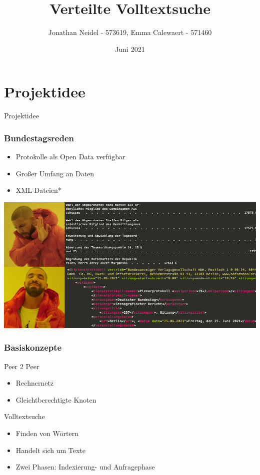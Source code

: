 \documentclass{beamer}
\title{Verteilte Volltextsuche}
\subtitle{}
\author{Jonathan Neidel - 573619, Emma Calewaert - 571460} %
\date{Juni 2021}
\institute{HTW Berlin, Angewandte Informatik, Projektstudium bei Herr Hoppe}
\begin{document}
\frame{\titlepage}

\section{Projektidee}
\begin{frame}
  \begin{center}
    {\Huge Projektidee}
  \end{center}
\end{frame}

\begin{frame}
  \frametitle{Bundestagsreden}
  \begin{itemize}
    \item Protokolle als Open Data verfügbar
    \item Großer Umfang an Daten
    \item XML-Dateien*
  \end{itemize}
\end{frame}

\begin{frame}  
    \hspace*{-10.75mm}
    \includegraphics[width=\paperwidth]{drakememe}
\end{frame}

\begin{frame}[allowframebreaks]
  \frametitle{Basiskonzepte}
  Peer 2 Peer
  \begin{itemize}
    \item Rechnernetz
    \item Gleichtberechtigte Knoten
  \end{itemize}

  \break
  Volltextsuche
    \begin{itemize}
    \item Finden von Wörtern
    \item Handelt sich um Texte
    \item Zwei Phasen: Indexierung- und Anfragephase
  \end{itemize}
\end{frame}
\end{document}
